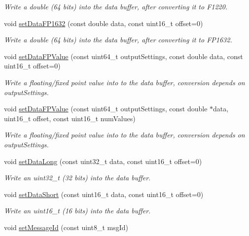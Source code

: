 \begin{DoxyCompactItemize}
\begin{DoxyCompactList}\small\item\em \-Write a double (64 bits) into the data buffer, after converting it to \-F1220. \end{DoxyCompactList}\item 
void \hyperlink{classxsens_1_1Message_a6969190c69e07c3ae765f1cfef9554f9}{set\-Data\-F\-P1632} (const double data, const uint16\-\_\-t offset=0)
\begin{DoxyCompactList}\small\item\em \-Write a double (64 bits) into the data buffer, after converting it to \-F\-P1632. \end{DoxyCompactList}\item 
void \hyperlink{classxsens_1_1Message_ac40c34dcf0e45554937f7e8196289bdd}{set\-Data\-F\-P\-Value} (const uint64\-\_\-t output\-Settings, const double data, const uint16\-\_\-t offset=0)
\begin{DoxyCompactList}\small\item\em \-Write a floating/fixed point value into to the data buffer, conversion depends on output\-Settings. \end{DoxyCompactList}\item 
void \hyperlink{classxsens_1_1Message_a320e09af46e9fa377f15e686e3ad4bbd}{set\-Data\-F\-P\-Value} (const uint64\-\_\-t output\-Settings, const double $\ast$data, uint16\-\_\-t offset, const uint16\-\_\-t num\-Values)
\begin{DoxyCompactList}\small\item\em \-Write a floating/fixed point value into to the data buffer, conversion depends on output\-Settings. \end{DoxyCompactList}\item 
void \hyperlink{classxsens_1_1Message_a18448355638d0d377623edcf33e82e08}{set\-Data\-Long} (const uint32\-\_\-t data, const uint16\-\_\-t offset=0)
\begin{DoxyCompactList}\small\item\em \-Write an uint32\-\_\-t (32 bits) into the data buffer. \end{DoxyCompactList}\item 
void \hyperlink{classxsens_1_1Message_a8526584a697316636b4bcec2e215ee87}{set\-Data\-Short} (const uint16\-\_\-t data, const uint16\-\_\-t offset=0)
\begin{DoxyCompactList}\small\item\em \-Write an uint16\-\_\-t (16 bits) into the data buffer. \end{DoxyCompactList}\item 
\hypertarget{classxsens_1_1Message_aac5c0fd0535b1cf872936f06440ebe9c}{void \hyperlink{classxsens_1_1Message_aac5c0fd0535b1cf872936f06440ebe9c}{set\-Message\-Id} (const uint8\-\_\-t msg\-Id)}\label{classxsens_1_1Message_aac5c0fd0535b1cf872936f06440ebe9c}


\end{DoxyCompactItemize}
